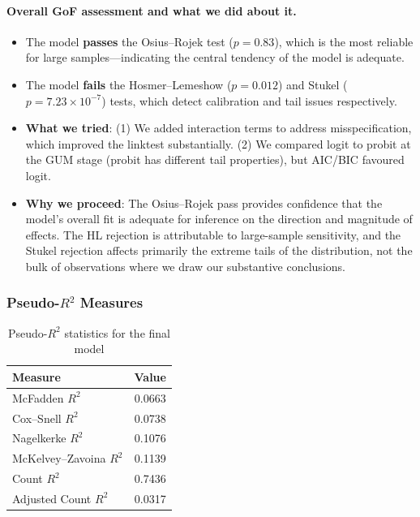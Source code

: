 \documentclass[12pt,a4paper]{article}
\begin{document}
\paragraph{Overall GoF assessment and what we did about it.}
\begin{itemize}
  \item The model \textbf{passes} the Osius--Rojek test ($p = 0.83$), which is the most reliable for large samples---indicating the central tendency of the model is adequate.
  \item The model \textbf{fails} the Hosmer--Lemeshow ($p = 0.012$) and Stukel ($p = 7.23 \times 10^{-7}$) tests, which detect calibration and tail issues respectively.
  \item \textbf{What we tried}: (1) We added interaction terms to address misspecification, which improved the linktest substantially. (2) We compared logit to probit at the GUM stage (probit has different tail properties), but AIC/BIC favoured logit.
  \item \textbf{Why we proceed}: The Osius--Rojek pass provides confidence that the model's overall fit is adequate for inference on the direction and magnitude of effects. The HL rejection is attributable to large-sample sensitivity, and the Stukel rejection affects primarily the extreme tails of the distribution, not the bulk of observations where we draw our substantive conclusions.
\end{itemize}

\subsubsection{Pseudo-$R^2$ Measures}

\begin{table}[H]
\centering
\caption{Pseudo-$R^2$ statistics for the final model}
\label{tab:r2}
\begin{tabular}{lc}
\toprule
Measure & Value \\
\midrule
McFadden $R^2$ & 0.0663 \\
Cox--Snell $R^2$ & 0.0738 \\
Nagelkerke $R^2$ & 0.1076 \\
McKelvey--Zavoina $R^2$ & 0.1139 \\
Count $R^2$ & 0.7436 \\
Adjusted Count $R^2$ & 0.0317 \\
\bottomrule
\end{tabular}
\end{table}
\end{document}
